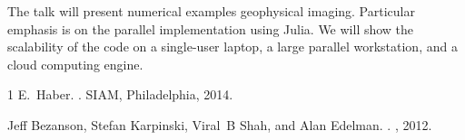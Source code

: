 \documentclass{report}
\begin{document}
The talk will present numerical examples geophysical imaging. Particular
emphasis is on the parallel implementation using Julia. We will show the
scalability of the code on a single-user laptop, a large parallel
workstation, and a cloud computing engine.

\begin{thebibliography}{1}
E.~Haber.
.
\newblock SIAM, Philadelphia, 2014.


Jeff Bezanson, Stefan Karpinski, Viral~B Shah, and Alan Edelman.
.
, 2012.
\end{thebibliography}
\end{document}
